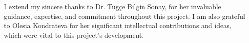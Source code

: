 
\begin{acknowledgements}
\addchaptertocentry{\acknowledgementname} 
I extend my sincere thanks to Dr. Tugçe Bilgin Sonay, for her invaluable guidance, expertise, and commitment throughout this project. I am also grateful to Olesia Kondrateva for her significant intellectual contributions and ideas, which were vital to this project's development.
\end{acknowledgements}
